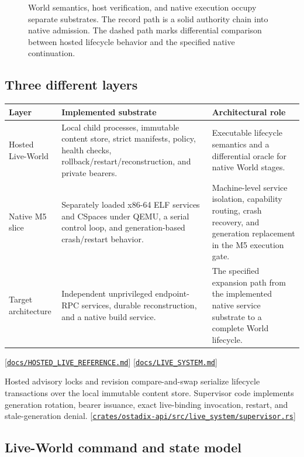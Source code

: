 \documentclass[11pt,oneside]{article}
\newcommand{\src}[1]{\textcolor{OSlate}{\scriptsize[\href{https://github.com/lostadi/OSTADIX/blob/c0b02c326b2329a95ba52447c7180bc93957cd57/#1}{\nolinkurl{#1}}]}\allowbreak}
\begin{document}
\begin{figure}[H]
\caption{World semantics, host verification, and native execution occupy
separate substrates. The record path is a solid authority chain into native
admission. The dashed path marks differential comparison between hosted
lifecycle behavior and the specified native continuation.}
\label{fig:world-substrates}
\end{figure}

\subsection{Three different layers}

\begin{longtable}{P{0.20\textwidth} P{0.38\textwidth} P{0.34\textwidth}}
\toprule
\textbf{Layer} & \textbf{Implemented substrate} & \textbf{Architectural role} \\
\midrule
\endhead
Hosted Live-World &
Local child processes, immutable content store, strict manifests, policy,
health checks, rollback/restart/reconstruction, and private bearers. &
Executable lifecycle semantics and a differential oracle for native World
stages. \\
Native M5 slice &
Separately loaded x86-64 ELF services and CSpaces under QEMU, a serial control
loop, and generation-based crash/restart behavior. &
Machine-level service isolation, capability routing, crash recovery, and
generation replacement in the M5 execution gate. \\
Target architecture &
Independent unprivileged endpoint-RPC services, durable reconstruction, and a
native build service. &
The specified expansion path from the implemented native service substrate to
a complete World lifecycle. \\
\bottomrule
\end{longtable}

\src{docs/HOSTED_LIVE_REFERENCE.md}
\src{docs/LIVE_SYSTEM.md}

Hosted advisory locks and revision compare-and-swap serialize lifecycle
transactions over the local immutable content store. Supervisor code
implements generation rotation, bearer issuance, exact live-binding
invocation, restart, and stale-generation denial.
\src{crates/ostadix-api/src/live_system/supervisor.rs}

\subsection{Live-World command and state model}
\end{document}
